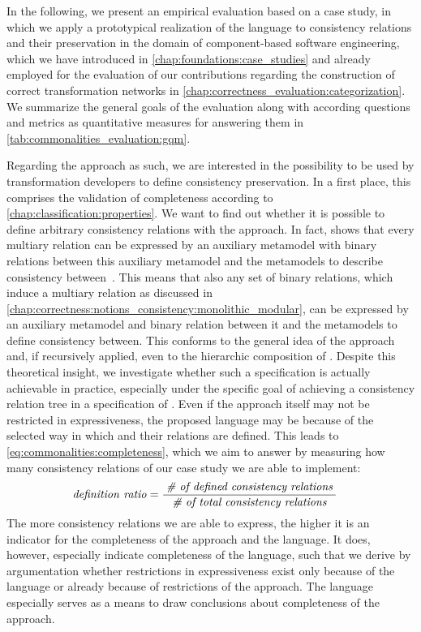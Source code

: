 In the following, we present an empirical evaluation based on a case study, in which we apply a prototypical realization of the \commonalities language to consistency relations and their preservation in the domain of component-based software engineering, which we have introduced in \autoref{chap:foundations:case_studies} and already employed for the evaluation of our contributions regarding the construction of correct transformation networks in \autoref{chap:correctness_evaluation:categorization}.
We summarize the general goals of the evaluation along with according questions and metrics as quantitative measures for answering them in \autoref{tab:commonalities_evaluation:gqm}.

Regarding the \commonalities approach as such, we are interested in the possibility to be used by transformation developers to define consistency preservation.
In a first place, this comprises the validation of completeness according to \autoref{chap:classification:properties}.
We want to find out whether it is possible to define arbitrary consistency relations with the \commonalities approach. 
In fact, \citeauthor{stevens2020BidirectionalTransformationLarge-SoSym} shows that every multiary relation can be expressed by an auxiliary metamodel with binary relations between this auxiliary metamodel and the metamodels to describe consistency between~\cite{stevens2020BidirectionalTransformationLarge-SoSym}.
This means that also any set of binary relations, which induce a multiary relation as discussed in \autoref{chap:correctness:notions_consistency:monolithic_modular}, can be expressed by an auxiliary metamodel and binary relation between it and the metamodels to define consistency between.
This conforms to the general idea of the \commonalities approach and, if recursively applied, even to the hierarchic composition of \commonalities.
Despite this theoretical insight, we investigate whether such a specification is actually achievable in practice, especially under the specific goal of achieving a consistency relation tree in a specification of \commonalities.
Even if the \commonalities approach itself may not be restricted in expressiveness, the proposed \commonalities language may be because of the selected way in which \commonalities and their relations are defined.
This leads to \autoref{eq:commonalities:completeness}, which we aim to answer by measuring how many consistency relations of our case study we are able to implement:
\begin{align*}
    &
    \mathit{definition\ ratio} = \frac{\; \textit{\# of defined consistency relations} \;}{\; \textit{\# of total consistency relations} \;}
\end{align*}
The more consistency relations we are able to express, the higher it is an indicator for the completeness of the approach and the language. 
It does, however, especially indicate completeness of the \commonalities language, such that we derive by argumentation whether restrictions in expressiveness exist only because of the language or already because of restrictions of the \commonalities approach.
The language especially serves as a means to draw conclusions about completeness of the approach.

